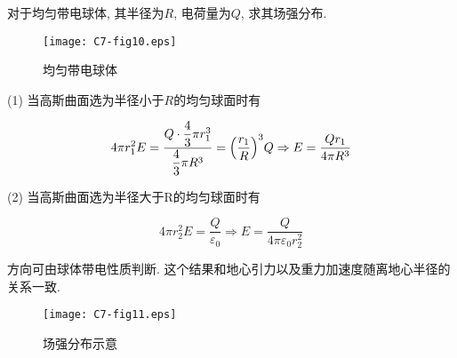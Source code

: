 \begin{example}
	对于均匀带电球体, 其半径为$R$, 电荷量为$Q$, 求其场强分布. 
	
	\begin{figure}[h]
		\centering
		\texttt{[image: C7-fig10.eps]}
		\caption{均匀带电球体}
	\end{figure}
	
	\begin{solution}
		
		(1) 当高斯曲面选为半径小于$R$的均匀球面时有
		
		\begin{equation*}
			4\pi r_1^2 E = \dfrac{Q \cdot {{{\dfrac{4}{3}}\pi r_1^3}}}{{\dfrac{4}{3}}\pi R^3} = {\qty(\dfrac{r_1}{R})}^3 Q \Rightarrow E = \dfrac{Q r_1}{4\pi R^3} 
		\end{equation*}
	
	    (2) 当高斯曲面选为半径大于R的均匀球面时有
	    
	    \begin{equation*}
	    	4\pi r_2^2 E = \dfrac{Q}{\varepsilon_0} \Rightarrow E = \dfrac{Q}{4\pi\varepsilon_0 r_2^2}
	    \end{equation*}
	    
	    方向可由球体带电性质判断. 这个结果和地心引力以及重力加速度随离地心半径的关系一致. 
	    
	    \begin{figure}[h]
	    	\centering
	    	\texttt{[image: C7-fig11.eps]}
	    	\caption{场强分布示意}
	    \end{figure}
	    
	\end{solution}
	
\end{example}

\newpage

